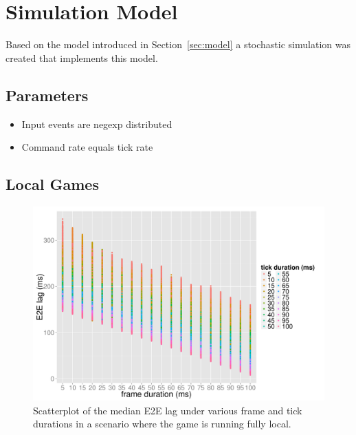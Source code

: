 \section{Simulation Model}
\label{sec:simulation}

Based on the model introduced in Section~\ref{sec:model} a stochastic simulation was created that implements this model.






\subsection{Parameters}
\begin{itemize}
  \item Input events are negexp distributed
  \item Command rate equals tick rate
\end{itemize}

\subsection{Local Games}

\begin{figure}[!t]
	\centering
	\includegraphics[width=1.0\columnwidth]{../simulation/visualization/nwless-onlinegame-1000rounds.pdf}
	\caption{Scatterplot of the median E2E lag under various frame and tick durations in a scenario where the game is running fully local.}
\label{fig:nwless-scatter}
\end{figure}


